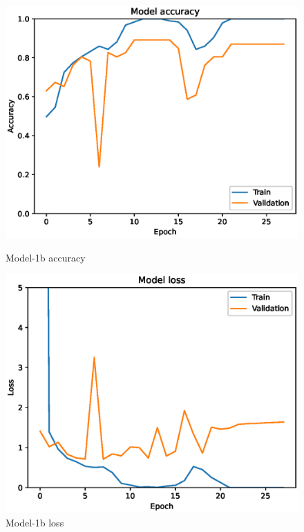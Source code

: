 \begin{figure}
    \centering
    \begin{minipage}{0.45\textwidth}
        \centering
        \includegraphics[width=\textwidth]{./fig/accuracy1b.eps}
        \caption{Model-1b accuracy}
        \label{fig:model1b_acc}
    \end{minipage}
    \begin{minipage}{0.45\textwidth}
        \centering
        \includegraphics[width=\textwidth]{./fig/loss1b.eps}
        \caption{Model-1b loss}
        \label{fig:model1b_loss}
    \end{minipage}
\end{figure}

